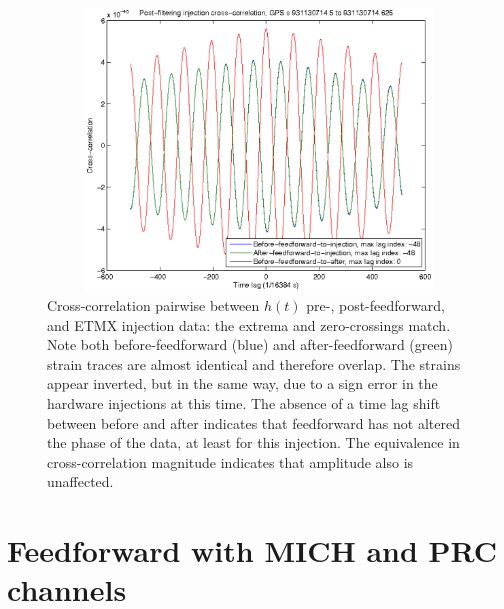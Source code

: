 \begin{figure}
\begin{center}
\includegraphics[height=75mm, width=150mm]{figure8.eps}
\caption{Cross-correlation pairwise between $h(t)$ pre-, post-feedforward, and ETMX injection data: the extrema and zero-crossings match.  Note both before-feedforward (blue) and after-feedforward (green) strain traces are almost identical and therefore overlap. The strains appear inverted, but in the same way, due to a sign error in the hardware injections at this time. The absence of a time lag shift between before and after indicates that feedforward has not altered the phase of the data, at least for this injection. The equivalence in cross-correlation magnitude indicates that amplitude also is unaffected.}
\label{crossCorrelationGraph}
\end{center}
\end{figure}




    \section{Feedforward with MICH and PRC channels}
    \label{out-of-loop}

